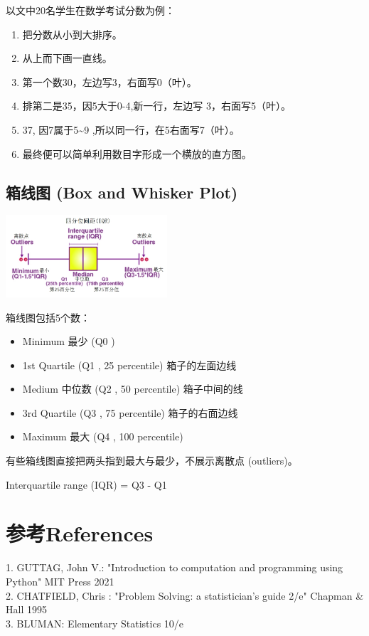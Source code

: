 以文中20名学生在数学考试分数为例：

\begin{enumerate}
\tightlist
\item
  把分数从小到大排序。
\item
  从上而下画一直线。
\item
  第一个数30，左边写3，右面写0（叶）。
\item
  排第二是35，因5大于0-4,新一行，左边写 3，右面写5（叶）。
\item
  37, 因7属于5\textasciitilde{}9 ,所以同一行，在5右面写7（叶）。
\item
  最终便可以简单利用数目字形成一个横放的直方图。
\end{enumerate}

\hypertarget{ux7bb1ux7ebfux56fe-box-and-whisker-plot}{%
\subsection{箱线图 (Box and Whisker
Plot)}\label{ux7bb1ux7ebfux56fe-box-and-whisker-plot}}


\includegraphics[width=6cm]{BoxWhiskerScreenshot_2021-08-02_2146031.jpg}

箱线图包括5个数：

\begin{itemize}
\tightlist
\item
  Minimum 最少 (Q0 )
\item
  1st Quartile (Q1 , 25 percentile) 箱子的左面边线
\item
  Medium 中位数 (Q2 , 50 percentile) 箱子中间的线
\item
  3rd Quartile (Q3 , 75 percentile) 箱子的右面边线
\item
  Maximum 最大 (Q4 , 100 percentile)
\end{itemize}

有些箱线图直接把两头指到最大与最少，不展示离散点 (outliers)。

Interquartile range (IQR) = Q3 - Q1

\hypertarget{ux53c2ux8003references}{%
\section{参考References}\label{ux53c2ux8003references}}

1. GUTTAG, John V.: "Introduction to computation and programming using
Python" MIT Press 2021\\
2. CHATFIELD, Chris : "Problem Solving: a statistician's guide 2/e"
Chapman \& Hall 1995\\
3. BLUMAN: Elementary Statistics 10/e\\


